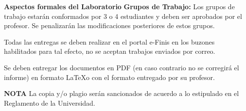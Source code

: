 \documentclass[a4paper]{article}
\begin{document}
\textbf{Aspectos formales del Laboratorio}
{\bf{Grupos de Trabajo}:} Los grupos de trabajo estarán conformados por 3 o 4 estudiantes y
deben ser aprobados por el profesor. Se penalizarán las modificaciones posteriores de
estos grupos.
\vspace*{.5cm}

Todas las entregas se deben realizar en el portal e-Finis en los buzones habilitados para
tal efecto, no se aceptan trabajos enviados por correo. 

\vspace*{.5cm}

Se deben entregar los documentos en PDF (en caso contrario no se corregirá el informe)
en formato \LaTeX o con el formato entregado por su profesor.



{\bf{NOTA}}
La copia y/o plagio serán sancionados de acuerdo a lo estipulado en el Reglamento de la
Universidad.
\end{document}
